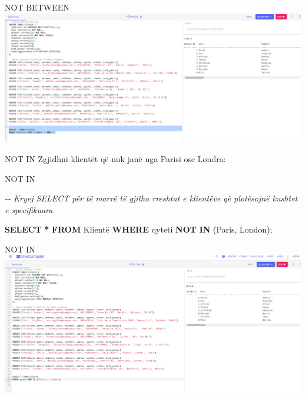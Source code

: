 \documentclass[
  ignorenonframetext,
]{beamer}
\newenvironment{Shaded}{\begin{snugshade}}{\end{snugshade}}
\newcommand{\CommentTok}[1]{\textcolor[rgb]{0.56,0.35,0.01}{\textit{#1}}}
\newcommand{\KeywordTok}[1]{\textcolor[rgb]{0.13,0.29,0.53}{\textbf{#1}}}
\newcommand{\NormalTok}[1]{#1}
\newcommand{\OperatorTok}[1]{\textcolor[rgb]{0.81,0.36,0.00}{\textbf{#1}}}
\newcommand{\StringTok}[1]{\textcolor[rgb]{0.31,0.60,0.02}{#1}}
\begin{document}
\begin{frame}{NOT BETWEEN}
\label{not-between-2}
\includegraphics{./Figs/query24.png}
\end{frame}

\begin{frame}{NOT IN}
\label{not-in}
Zgjidhni klientët që nuk janë nga Parisi ose Londra:
\end{frame}

\begin{frame}[fragile]{NOT IN}
\label{not-in-1}

\begin{Shaded}
\begin{Highlighting}[]
\CommentTok{{-}{-} Kryej SELECT për të marrë të gjitha rreshtat e klientëve që plotësojnë kushtet e specifikuara}

\KeywordTok{SELECT} \OperatorTok{*} \KeywordTok{FROM}\NormalTok{ Klientë}
\KeywordTok{WHERE}\NormalTok{ qyteti }\KeywordTok{NOT} \KeywordTok{IN}\NormalTok{ (}\StringTok{\textquotesingle{}Paris\textquotesingle{}}\NormalTok{, }\StringTok{\textquotesingle{}London\textquotesingle{}}\NormalTok{);}
\end{Highlighting}
\end{Shaded}
\end{frame}

\begin{frame}{NOT IN}
\label{not-in-2}
\includegraphics{./Figs/query26.png}
\end{frame}
\end{document}
